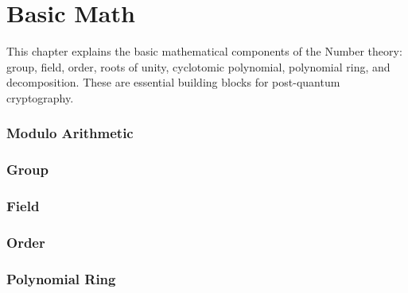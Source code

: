 \documentclass[11pt]{article}
\begin{document}



\clearpage



\part{Basic Math}
\label{part:basic-math}

\renewcommand{\thesection}{A-\arabic{section}}
\setcounter{section}{0}

This chapter explains the basic mathematical components of the Number theory: group, field, order, roots of unity, cyclotomic polynomial, polynomial ring, and decomposition. These are essential building blocks for post-quantum cryptography.

\clearpage

\section{Modulo Arithmetic}
\label{sec:modulo}


\clearpage

\section{Group}
\label{sec:group}



\clearpage

\section{Field}
\label{sec:field}


\clearpage

\section{Order}
\label{sec:order}




\clearpage

\section{Polynomial Ring}
\label{sec:polynomial-ring}

\end{document}

